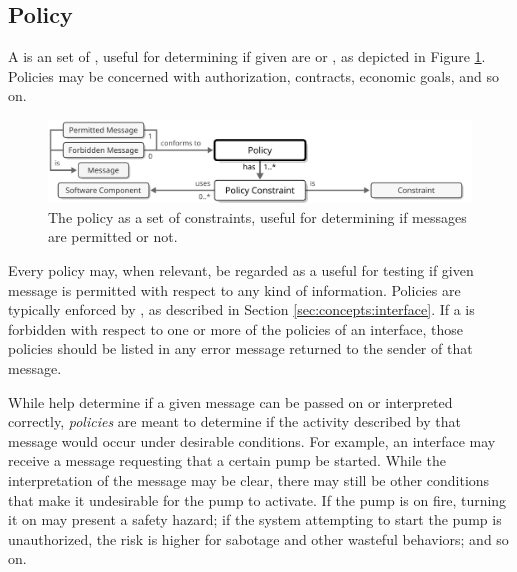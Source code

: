 \newpage

\subsection{Policy}
\label{sec:concepts:policy}

A  is an  set of , useful for determining if given  are  or , as depicted in Figure \ref{fig:policy}.
Policies may be concerned with authorization, contracts, economic goals, and so on.

\begin{figure}[ht!]
  \centering
  \includegraphics[scale=0.9]{figures/policy}
  \caption{
    The policy as a set of constraints, useful for determining if messages are permitted or not.
  }
  \label{fig:policy}
\end{figure}

Every policy may, when relevant, be regarded as a  useful for testing if given message is permitted with respect to any kind of information.
Policies are typically enforced by , as described in Section \ref{sec:concepts:interface}.
If a  is forbidden with respect to one or more of the policies of an interface, those policies should be listed in any error message returned to the sender of that message.

While  help determine if a given message can be passed on or interpreted correctly, \textit{policies} are meant to determine if the activity described by that message would occur under desirable conditions.
For example, an interface may receive a message requesting that a certain pump be started.
While the interpretation of the message may be clear, there may still be other conditions that make it undesirable for the pump to activate.
If the pump is on fire, turning it on may present a safety hazard; if the system attempting to start the pump is unauthorized, the risk is higher for sabotage and other wasteful behaviors; and so on.

